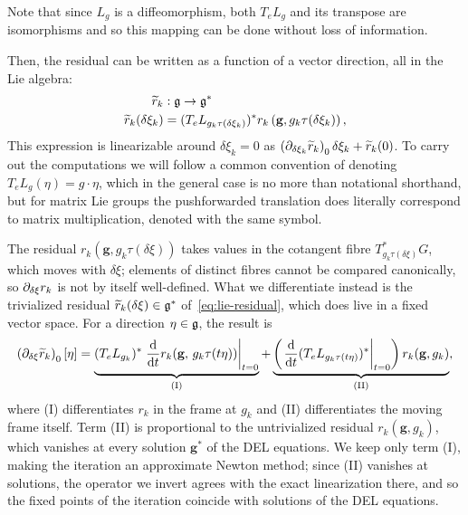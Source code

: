 Note that since $L_g$ is a diffeomorphism, both $T_e L_g$ and its transpose are isomorphisms and so this mapping can be done without loss of information.

Then, the residual can be written as a function of a vector direction, all in the Lie algebra:
\begin{equation}
	\begin{aligned}
		\widetilde{r}_k              & : {\mathfrak{g}} \to {\mathfrak{g}}^*                                                                       \\
		\widetilde{r}_k(\delta\xi_k) & = (T_e L_{g_k \tau(\delta\xi_k)})^* r_k\left(\mathbf{g}, g_k\tau(\delta\xi_k)\right),
	\end{aligned}
	\label{eq:lie-residual}
\end{equation}
This expression is linearizable around $\delta\xi_k = 0$ as $\pdv{\widetilde{r}_k}!{\delta \xi_k}_0 \delta\xi_k + \widetilde{r}_k(0)$. To carry out the computations we will follow a common convention of denoting $T_e L_g(\eta) = g \cdot \eta$, which in the general case is no more than notational shorthand, but for matrix Lie groups the pushforwarded translation does literally correspond to matrix multiplication, denoted with the same symbol.

The residual $r_k(\mathbf{g}, g_k\tau(\delta\xi))$ takes values in the cotangent fibre $T_{g_k\tau(\delta\xi)}^*G$, which moves with $\delta\xi$; elements of distinct fibres cannot be compared canonically, so $\pdv{r_k}!{\delta\xi}$ is not by itself well-defined. What we differentiate instead is the trivialized residual $\widetilde{r}_k(\delta\xi) \in {\mathfrak{g}}^*$ of~\eqref{eq:lie-residual}, which does live in a fixed vector space. For a direction $\eta \in {\mathfrak{g}}$, the result is
\[
	\pdv{\widetilde{r}_k}!{\delta\xi}_0[\eta] =
	\underbrace{(T_e L_{g_k})^* \odv*{r_k(\mathbf{g},\, g_k\tau(t\eta))}{t}_{t=0}}_{\text{(I)}}
	+ \underbrace{\left(\odv*{(T_e L_{g_k\tau(t\eta)})^*}{t}_{t=0}\right) r_k(\mathbf{g}, g_k)}_{\text{(II)}},
\]
where (I) differentiates $r_k$ in the frame at $g_k$ and (II) differentiates the moving frame itself. Term (II) is proportional to the untrivialized residual $r_k(\mathbf{g}, g_k)$, which vanishes at every solution $\mathbf{g}^*$ of the DEL equations. We keep only term (I), making the iteration an approximate Newton method; since (II) vanishes at solutions, the operator we invert agrees with the exact linearization there, and so the fixed points of the iteration coincide with solutions of the DEL equations.


